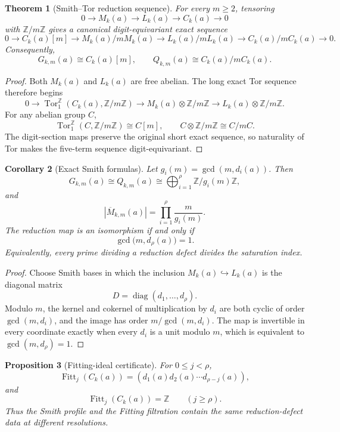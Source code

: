 \documentclass[11pt]{article}
\newtheorem{theorem}{Theorem}[section]
\newtheorem{proposition}[theorem]{Proposition}
\newtheorem{corollary}[theorem]{Corollary}
\theoremstyle{definition}
\theoremstyle{remark}
\begin{document}
\begin{theorem}[Smith--Tor reduction sequence]
\label{thm:block06-tor-sequence}
For every \(m\geq2\), tensoring
\[
0\longrightarrow M_k(a)\longrightarrow L_k(a)\longrightarrow C_k(a)\longrightarrow0
\]
with \(\mathbb Z/m\mathbb Z\) gives a canonical digit-equivariant exact sequence
\[
0
\longrightarrow
C_k(a)[m]
\longrightarrow
M_k(a)/mM_k(a)
\longrightarrow
L_k(a)/mL_k(a)
\longrightarrow
C_k(a)/mC_k(a)
\longrightarrow
0.
\]
Consequently,
\[
G_{k,m}(a)\cong C_k(a)[m],
\qquad
Q_{k,m}(a)\cong C_k(a)/mC_k(a).
\]
\end{theorem}

\begin{proof}
Both \(M_k(a)\) and \(L_k(a)\) are free abelian.  The long exact Tor sequence therefore begins
\[
0\longrightarrow
\operatorname{Tor}_1^{\mathbb Z}
(C_k(a),\mathbb Z/m\mathbb Z)
\longrightarrow
M_k(a)\otimes\mathbb Z/m\mathbb Z
\longrightarrow
L_k(a)\otimes\mathbb Z/m\mathbb Z.
\]
For any abelian group \(C\),
\[
\operatorname{Tor}_1^{\mathbb Z}(C,\mathbb Z/m\mathbb Z)
\cong C[m],
\qquad
C\otimes\mathbb Z/m\mathbb Z
\cong C/mC.
\]
The digit-section maps preserve the original short exact sequence, so naturality of Tor makes the five-term sequence digit-equivariant.
\end{proof}

\begin{corollary}[Exact Smith formulas]
\label{cor:block06-smith-formulas}
Let \(g_i(m)=\gcd(m,d_i(a))\).  Then
\[
G_{k,m}(a)
\cong
Q_{k,m}(a)
\cong
\bigoplus_{i=1}^{\rho}
\mathbb Z/g_i(m)\mathbb Z,
\]
and
\[
\left|\overline M_{k,m}(a)\right|
=
\prod_{i=1}^{\rho}
\frac{m}{g_i(m)}.
\]
The reduction map is an isomorphism if and only if
\[
\gcd\bigl(m,d_\rho(a)\bigr)=1.
\]
Equivalently, every prime dividing a reduction defect divides the saturation index.
\end{corollary}

\begin{proof}
Choose Smith bases in which the inclusion \(M_k(a)\hookrightarrow L_k(a)\) is the diagonal matrix
\[
D=\operatorname{diag}(d_1,\ldots,d_\rho).
\]
Modulo \(m\), the kernel and cokernel of multiplication by \(d_i\) are both cyclic of order \(\gcd(m,d_i)\), and the image has order \(m/\gcd(m,d_i)\).  The map is invertible in every coordinate exactly when every \(d_i\) is a unit modulo \(m\), which is equivalent to \(\gcd(m,d_\rho)=1\).
\end{proof}

\begin{proposition}[Fitting-ideal certificate]
\label{prop:block06-fitting}
For \(0\leq j<\rho\),
\[
\operatorname{Fitt}_j(C_k(a))
=
\left(
d_1(a)d_2(a)\cdots d_{\rho-j}(a)
\right),
\]
and
\[
\operatorname{Fitt}_j(C_k(a))=\mathbb Z
\qquad
(j\geq\rho).
\]
Thus the Smith profile and the Fitting filtration contain the same reduction-defect data at different resolutions.
\end{proposition}
\end{document}
